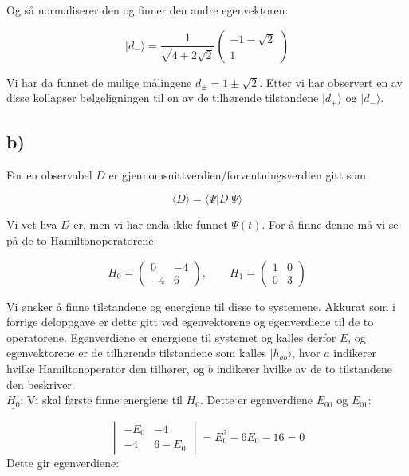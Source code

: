 \documentclass[a4paper,norsk, 10pt]{article}
\numberwithin{equation}{section}
\begin{document}
Og så normaliserer den og finner den andre egenvektoren:

\begin{equation}
|d_-\rangle = \frac{1}{\sqrt{4+2\sqrt{2}}}
\begin{pmatrix}
-1 - \sqrt{2}\\
1
\end{pmatrix}
\label{eq:d-}
\end{equation}

Vi har da funnet de mulige målingene $d_{\pm} = 1 \pm \sqrt{2}$. Etter vi har observert en av disse kollapser bølgeligningen til en av de tilhørende tilstandene $|d_+\rangle$ og $|d_-\rangle$.

\subsection*{b)}

For en observabel $D$ er gjennomsnittverdien/forventningsverdien gitt som

$$
\langle D\rangle = \langle\Psi | D | \Psi \rangle
$$

Vi vet hva $D$ er, men vi har enda ikke funnet $\Psi(t)$. For å finne denne må vi se på de to Hamiltonoperatorene:

$$
H_0 = 
\begin{pmatrix}
0 & -4\\
-4 & 6
\end{pmatrix}
, \qquad
H_1 = 
\begin{pmatrix}
1 & 0\\
0 & 3
\end{pmatrix}
$$

Vi ønsker å finne tilstandene og energiene til disse to systemene. Akkurat som i forrige deloppgave er dette gitt ved egenvektorene og egenverdiene til de to operatorene. Egenverdiene er energiene til systemet og kalles derfor $E$, og egenvektorene er de tilhørende tilstandene som kalles $|h_{ab}\rangle$, hvor $a$ indikerer hvilke Hamiltonoperator den tilhører, og $b$ indikerer hvilke av de to tilstandene den beskriver.\\

\textbf{$\underline{H_0}$}: Vi skal første finne energiene til $H_0$. Dette er egenverdiene $E_{00}$ og $E_{01}$:

$$
\begin{vmatrix}
-E_0 & -4\\
-4 & 6-E_0
\end{vmatrix}
= E_0^2 -6E_0 - 16 = 0
$$
Dette gir egenverdiene:
\end{document}
